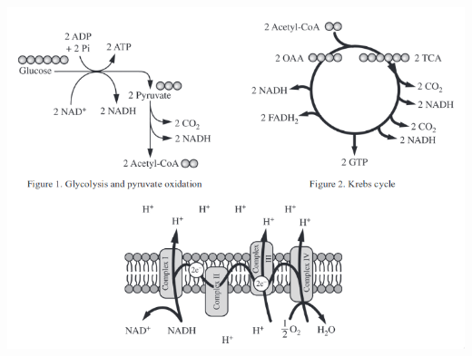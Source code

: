 \documentclass{article}
\begin{document}
\begin{enumerate}
\begin{itemize}
\begin{center}
\includegraphics[scale=0.3]{etc}
\end{center}
\end{itemize}
\end{enumerate}
\end{document}
